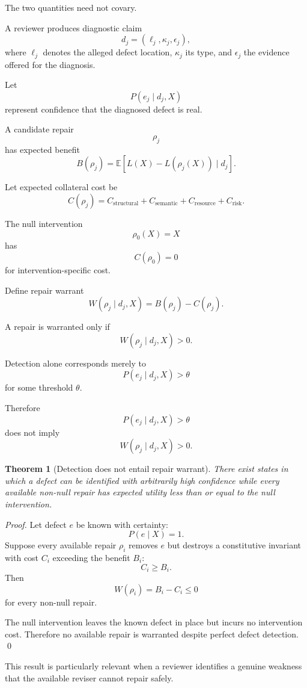 \documentclass[11pt]{article}
\newtheorem{theorem}[definition]{Theorem}
\begin{document}
The two quantities need not covary.

A reviewer produces diagnostic claim
\[
    d_j
    =
    (\ell_j,\kappa_j,\epsilon_j),
\]
where \(\ell_j\) denotes the alleged defect location, \(\kappa_j\) its type, and \(\epsilon_j\) the evidence offered for the diagnosis.

Let
\[
    P(e_j\mid d_j,X)
\]
represent confidence that the diagnosed defect is real.

A candidate repair
\[
    \rho_j
\]
has expected benefit
\[
    B(\rho_j)
    =
    \mathbb{E}
    \left[
        L(X)-L(\rho_j(X))
        \mid
        d_j
    \right].
\]

Let expected collateral cost be
\[
    C(\rho_j)
    =
    C_{\mathrm{structural}}
    +
    C_{\mathrm{semantic}}
    +
    C_{\mathrm{resource}}
    +
    C_{\mathrm{risk}}.
\]

The null intervention
\[
    \rho_0(X)=X
\]
has
\[
    C(\rho_0)=0
\]
for intervention-specific cost.

Define repair warrant
\[
    W(\rho_j\mid d_j,X)
    =
    B(\rho_j)-C(\rho_j).
\]

A repair is warranted only if
\[
    W(\rho_j\mid d_j,X)>0.
\]

Detection alone corresponds merely to
\[
    P(e_j\mid d_j,X)>\theta
\]
for some threshold \(\theta\).

Therefore
\[
    P(e_j\mid d_j,X)>\theta
\]
does not imply
\[
    W(\rho_j\mid d_j,X)>0.
\]

\begin{theorem}[Detection does not entail repair warrant]
There exist states in which a defect can be identified with arbitrarily high confidence while every available non-null repair has expected utility less than or equal to the null intervention.
\end{theorem}

\begin{proof}
Let defect \(e\) be known with certainty:
\[
    P(e\mid X)=1.
\]
Suppose every available repair \(\rho_i\) removes \(e\) but destroys a constitutive invariant with cost \(C_i\) exceeding the benefit \(B_i\):
\[
    C_i\geq B_i.
\]
Then
\[
    W(\rho_i)=B_i-C_i\leq0
\]
for every non-null repair.

The null intervention leaves the known defect in place but incurs no intervention cost. Therefore no available repair is warranted despite perfect defect detection. \qed
\end{proof}

This result is particularly relevant when a reviewer identifies a genuine weakness that the available reviser cannot repair safely.
\end{document}
